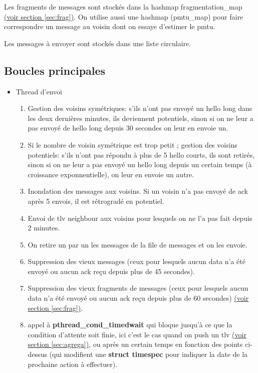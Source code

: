 \documentclass[a4paper,10pt]{article} %
\begin{document}
Les fragments de messages sont stockés dans la hashmap \textrm{fragmentation\_map} \hyperref[sec:frag]{(voir section \ref{sec:frag})}. On utilise aussi une hashmap (\textrm{pmtu\_map}) pour faire correspondre un message au voisin dont on essaye d'estimer le pmtu.

Les messages à envoyer sont stockés dans une liste circulaire.

\subsection{Boucles principales}
\begin{itemize}
    \item Thread d'envoi
\begin{enumerate}
\item Gestion des voisins symétriques: s'ils n'ont pas envoyé un hello long dans les deux dernières minutes, ils deviennent potentiels, sinon si on ne leur a pas envoyé de hello long depuis 30 secondes on leur en envoie un.
\item Si le nombre de voisin symétrique est trop petit ; gestion des voisins potentiels: s'ils n'ont pas répondu à plus de 5 hello courts, ils sont retirés, sinon si on ne leur a pas envoyé un hello long depuis un certain temps (à croissance exponnentielle), on leur en envoie un autre.
\item Inondation des messages aux voisins. Si un voisin n'a pas envoyé de ack après 5 envois, il est rétrogradé en potentiel.
\item Envoi de tlv neighbour aux voisins pour lesquels on ne l'a pas fait depuis 2 minutes.
\item On retire un par un les messages de la file de messages et on les envoie.
\item Suppression des vieux messages (ceux pour lesquels aucun data n'a été envoyé ou aucun ack reçu depuis plus de 45 secondes).
\item Suppression des vieux fragments de messages (ceux pour lesquels aucun data n'a été envoyé ou aucun ack reçu depuis plus de 60 secondes) \hyperref[sec:frag]{(voir section \ref{sec:frag})}.
\item appel à \textbf{pthread\_cond\_timedwait} qui bloque jusqu'à ce que la condition d'attente soit finie, ici c'est le cas quand on push un tlv \hyperref[sec:frag]{(voir section \ref{sec:agrega})}, ou après un certain temps en fonction des points ci-dessus (qui modifient une \textbf{struct timespec} pour indiquer la date de la prochaine action à effectuer).
\end{enumerate}

\end{itemize}
\end{document}
